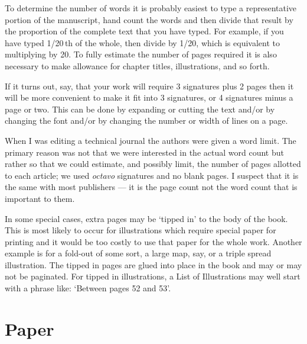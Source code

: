\documentclass[10pt,letterpaper,extrafontsizes]{memoir}
\begin{document}
    To determine the number of words it is probably easiest to type a
representative portion of the manuscript, hand count the words and then
divide that result by the proportion of the complete text that you have
typed. For example, if you have typed 1/20\,th of the whole, then divide
by 1/20, which is equivalent to multiplying by 20. To fully estimate
the number of pages required it is also necessary to make allowance for
chapter titles, illustrations, and so forth.

    If it turns out, say, that your work will require 3 signatures plus 2
pages then it will be more convenient to make it fit into 3 signatures,
or 4 signatures minus a page or two. This can be done by expanding or cutting
the text and/or by changing the font 
and/or by changing the number or width
of lines on a page.

    When I was editing a technical journal the authors were given a word 
limit. The primary reason was not that we were interested in the actual
word count but rather so that we could estimate, and possibly limit, 
the number of pages allotted
to each article; we used \emph{octavo} 
signatures and no blank pages. 
I suspect that it is
the same with most publishers --- it is the page count not the word count
that is important to them.

    In some special cases, extra pages may be `tipped in' to
the body of the book. This is most likely to occur for 
illustrations which
require special paper for printing and it would be too costly to use
that paper for the whole work. Another example is for a fold-out of some sort,
a large map, say, or a triple spread illustration. The tipped in pages
are glued into place in the book and may or may not be paginated. For
tipped in illustrations, a List of Illustrations may well start with
a phrase like: `Between pages 52 and 53'.


\section{Paper}

\end{document}
